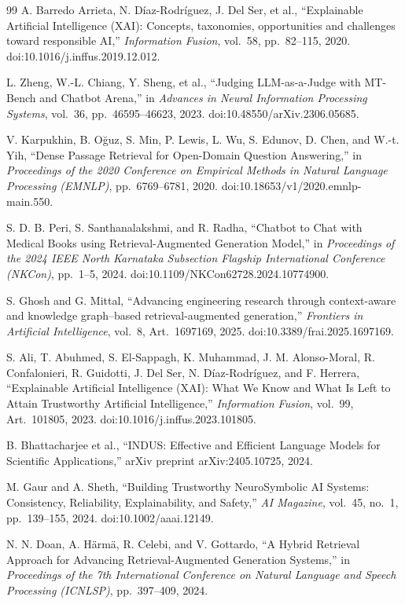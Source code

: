 \documentclass[a4paper,fleqn]{cas-sc}
\begin{document}
\begin{thebibliography}{99}
A. Barredo Arrieta, N. D\'{i}az-Rodr\'{i}guez, J. Del Ser, et al.,
``Explainable Artificial Intelligence (XAI): Concepts, taxonomies, opportunities and challenges toward responsible AI,''
\textit{Information Fusion},
vol.~58,
pp.~82--115,
2020.
doi:10.1016/j.inffus.2019.12.012.

L. Zheng, W.-L. Chiang, Y. Sheng, et al.,
``Judging LLM-as-a-Judge with MT-Bench and Chatbot Arena,''
in \textit{Advances in Neural Information Processing Systems},
vol.~36,
pp.~46595--46623,
2023.
doi:10.48550/arXiv.2306.05685.

V. Karpukhin, B. O\u{g}uz, S. Min, P. Lewis, L. Wu, S. Edunov, D. Chen, and W.-t. Yih,
``Dense Passage Retrieval for Open-Domain Question Answering,''
in \textit{Proceedings of the 2020 Conference on Empirical Methods in Natural Language Processing (EMNLP)},
pp.~6769--6781,
2020.
doi:10.18653/v1/2020.emnlp-main.550.

S. D. B. Peri, S. Santhanalakshmi, and R. Radha,
``Chatbot to Chat with Medical Books using Retrieval-Augmented Generation Model,''
in \textit{Proceedings of the 2024 IEEE North Karnataka Subsection Flagship International Conference (NKCon)},
pp.~1--5,
2024.
doi:10.1109/NKCon62728.2024.10774900.

S. Ghosh and G. Mittal,
``Advancing engineering research through context-aware and knowledge graph--based retrieval-augmented generation,''
\textit{Frontiers in Artificial Intelligence},
vol.~8,
Art.~1697169,
2025.
doi:10.3389/frai.2025.1697169.

S. Ali, T. Abuhmed, S. El-Sappagh, K. Muhammad,
J. M. Alonso-Moral, R. Confalonieri,
R. Guidotti, J. Del Ser,
N. Díaz-Rodríguez, and F. Herrera,
``Explainable Artificial Intelligence (XAI): What We Know and What Is Left to Attain Trustworthy Artificial Intelligence,''
\textit{Information Fusion},
vol.~99,
Art.~101805,
2023.
doi:10.1016/j.inffus.2023.101805.

B. Bhattacharjee et al.,
``INDUS: Effective and Efficient Language Models for Scientific Applications,''
arXiv preprint arXiv:2405.10725,
2024.

M. Gaur and A. Sheth,
``Building Trustworthy NeuroSymbolic AI Systems: Consistency, Reliability, Explainability, and Safety,''
\textit{AI Magazine},
vol.~45,
no.~1,
pp.~139--155,
2024.
doi:10.1002/aaai.12149.

N. N. Doan, A. H{\"a}rm{\"a}, R. Celebi, and V. Gottardo,
``A Hybrid Retrieval Approach for Advancing Retrieval-Augmented Generation Systems,''
in \textit{Proceedings of the 7th International Conference on Natural Language and Speech Processing (ICNLSP)},
pp.~397--409,
2024.


\end{thebibliography}
\end{document}
